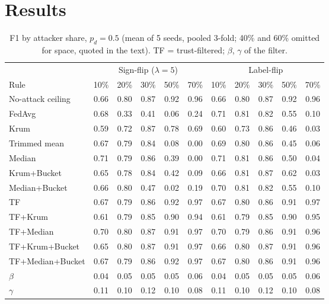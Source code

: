 \documentclass[conference]{IEEEtran}
\begin{document}
\section{Results}
\label{sec:results}

\begin{table}[t]
\caption{F1 by attacker share, $p_d = 0.5$ (mean of 5 seeds, pooled 3-fold; 40\% and 60\% omitted for space,
quoted in the text). TF = trust-filtered; $\beta$, $\gamma$ of the filter.}
\label{tab:main}
\centering
\setlength{\tabcolsep}{4pt}
\begin{tabular}{l|ccccc|ccccc}
\toprule
& \multicolumn{5}{c|}{Sign-flip ($\lambda = 5$)} & \multicolumn{5}{c}{Label-flip}\\
Rule & 10\% & 20\% & 30\% & 50\% & 70\% & 10\% & 20\% & 30\% & 50\% & 70\%\\
\midrule
No-attack ceiling & 0.66 & 0.80 & 0.87 & 0.92 & 0.96 & 0.66 & 0.80 & 0.87 & 0.92 & 0.96\\
\midrule
FedAvg & 0.68 & 0.33 & 0.41 & 0.06 & 0.24 & 0.71 & 0.81 & 0.82 & 0.55 & 0.10\\
Krum & 0.59 & 0.72 & 0.87 & 0.78 & 0.69 & 0.60 & 0.73 & 0.86 & 0.46 & 0.03\\
Trimmed mean & 0.67 & 0.79 & 0.84 & 0.08 & 0.00 & 0.69 & 0.80 & 0.86 & 0.45 & 0.06\\
Median & 0.71 & 0.79 & 0.86 & 0.39 & 0.00 & 0.71 & 0.81 & 0.86 & 0.50 & 0.04\\
Krum+Bucket & 0.65 & 0.78 & 0.84 & 0.42 & 0.09 & 0.66 & 0.81 & 0.87 & 0.62 & 0.03\\
Median+Bucket & 0.66 & 0.80 & 0.47 & 0.02 & 0.19 & 0.70 & 0.81 & 0.82 & 0.55 & 0.10\\
\midrule
TF & 0.67 & 0.79 & 0.86 & 0.92 & 0.97 & 0.67 & 0.80 & 0.86 & 0.91 & 0.97\\
TF+Krum & 0.61 & 0.79 & 0.85 & 0.90 & 0.94 & 0.61 & 0.79 & 0.85 & 0.90 & 0.95\\
TF+Median & 0.70 & 0.80 & 0.87 & 0.91 & 0.97 & 0.70 & 0.79 & 0.86 & 0.91 & 0.96\\
TF+Krum+Bucket & 0.65 & 0.80 & 0.87 & 0.91 & 0.97 & 0.66 & 0.80 & 0.87 & 0.91 & 0.96\\
TF+Median+Bucket & 0.67 & 0.79 & 0.86 & 0.92 & 0.97 & 0.67 & 0.80 & 0.86 & 0.91 & 0.96\\
\midrule
$\beta$ & 0.04 & 0.05 & 0.05 & 0.05 & 0.06 & 0.04 & 0.05 & 0.05 & 0.05 & 0.06\\
$\gamma$ & 0.11 & 0.10 & 0.12 & 0.10 & 0.08 & 0.11 & 0.10 & 0.12 & 0.10 & 0.08\\
\bottomrule
\end{tabular}
\end{table}
\end{document}
